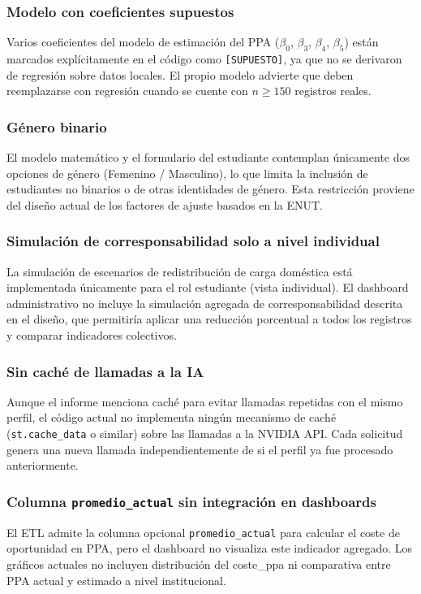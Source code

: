 \documentclass[12pt, spanish]{article}
\begin{document}
\subsubsection{Modelo con coeficientes supuestos}
Varios coeficientes del modelo de estimación del PPA (\(\beta_0\), \(\beta_3\), \(\beta_4\), \(\beta_5\)) están marcados explícitamente en el código como \texttt{[SUPUESTO]}, ya que no se derivaron de regresión sobre datos locales. El propio modelo advierte que deben reemplazarse con regresión cuando se cuente con \(n \geq 150\) registros reales.

\subsubsection{Género binario}
El modelo matemático y el formulario del estudiante contemplan únicamente dos opciones de género (Femenino / Masculino), lo que limita la inclusión de estudiantes no binarios o de otras identidades de género. Esta restricción proviene del diseño actual de los factores de ajuste basados en la ENUT.

\subsubsection{Simulación de corresponsabilidad solo a nivel individual}
La simulación de escenarios de redistribución de carga doméstica está implementada únicamente para el rol estudiante (vista individual). El dashboard administrativo no incluye la simulación agregada de corresponsabilidad descrita en el diseño, que permitiría aplicar una reducción porcentual a todos los registros y comparar indicadores colectivos.

\subsubsection{Sin caché de llamadas a la IA}
Aunque el informe menciona caché para evitar llamadas repetidas con el mismo perfil, el código actual no implementa ningún mecanismo de caché (\texttt{st.cache\_data} o similar) sobre las llamadas a la NVIDIA API. Cada solicitud genera una nueva llamada independientemente de si el perfil ya fue procesado anteriormente.

\subsubsection{Columna \texttt{promedio\_actual} sin integración en dashboards}
El ETL admite la columna opcional \texttt{promedio\_actual} para calcular el coste de oportunidad en PPA, pero el dashboard no visualiza este indicador agregado. Los gráficos actuales no incluyen distribución del coste\_ppa ni comparativa entre PPA actual y estimado a nivel institucional.
\end{document}
